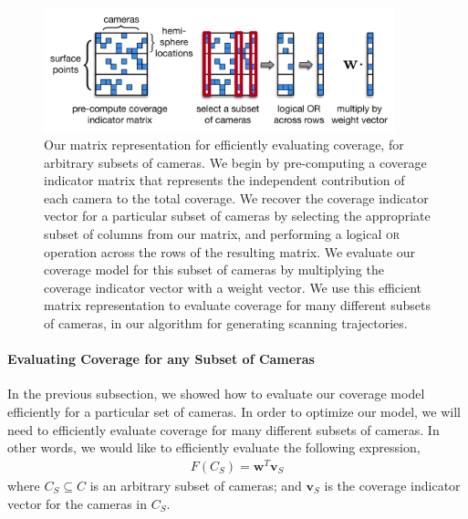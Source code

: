 \begin{figure}[t]
\begin{center}
\includegraphics[width=4.0in]{images/2017_iccv_supplementary/coverage_matrix.pdf}
\end{center}
\caption{
Our matrix representation for efficiently evaluating coverage, for arbitrary subsets of cameras.
We begin by pre-computing a coverage indicator matrix that represents the independent contribution of each camera to the total coverage.
We recover the coverage indicator vector  for a particular subset of cameras by selecting the appropriate subset of columns from our matrix, and performing a logical \textsc{or} operation across the rows of the resulting matrix.
We evaluate our coverage model for this subset of cameras by multiplying the coverage indicator vector with a weight vector.
We use this efficient matrix representation to evaluate coverage for many different subsets of cameras, in our algorithm for generating scanning trajectories.
}
\label{fig:ch4:coverage_matrix}
\end{figure}

\paragraph{Evaluating Coverage for any Subset of Cameras}
In the previous subsection, we showed how to evaluate our coverage model efficiently for a particular set of cameras.
In order to optimize our model, we will need to efficiently evaluate coverage for many different subsets of cameras.
In other words, we would like to efficiently evaluate the following expression, 
%
\begin{equation}
\begin{aligned}
F(C_S) = \mathbf{w}^T \mathbf{v}_S
\end{aligned}
\end{equation}
%
where $C_S \subseteq C$ is an arbitrary subset of cameras;
and $\mathbf{v}_S$ is the coverage indicator vector for the cameras in $C_S$. 


